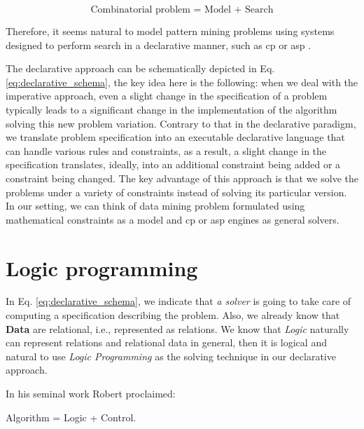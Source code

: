 \begin{center}
\begin{equation}\label{eq:declarative_schema}
  \text{Combinatorial problem = Model + Search}
\end{equation}
\end{center}

Therefore, it seems natural to model pattern mining problems 
using systems designed to perform search in a declarative manner, such
as \acrlong{cp} \parencite{handbookcp} or \acrlong{asp}
\parencite{whatisasp}. %

\pubrev


The declarative approach can be schematically depicted in Eq.
\ref{eq:declarative_schema}, the key idea here is the following: when
we deal with the imperative approach, even a slight change in the
specification of a problem typically leads to a significant change in
the implementation of the algorithm solving this new problem
variation. Contrary to that in the declarative paradigm, we translate
problem specification into an executable declarative language that can
handle various rules and constraints, as a result, a slight change in
the specification translates, ideally, into an additional constraint
being added or a constraint being changed. The key advantage of this
approach is that we solve the problems under a variety of constraints instead of
solving its particular version. In our setting, we can think of data
mining problem formulated using mathematical constraints as a
model and \acrshort{cp} or \acrshort{asp} engines
as general solvers.
\pubrevend



\section{Logic programming}
\pubrev
In Eq. \ref{eq:declarative_schema}, we indicate that \textit{a solver}
is going to take care of computing a specification describing the
problem. Also, we already know that \textbf{Data} are relational, i.e., represented as relations. We know that \textit{Logic} naturally can represent relations and relational data in general, then it is logical and natural to use \textit{Logic Programming} as the solving technique in our declarative approach.
\pubrev

In his seminal work Robert \textcite{kowalski} proclaimed:
\begin{center}
  Algorithm = Logic + Control.
\end{center}

